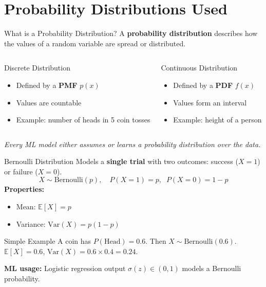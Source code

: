 \section{Probability Distributions Used}

\begin{frame}{What is a Probability Distribution?}
A \textbf{probability distribution} describes how the values of a random variable are spread or distributed.

\begin{columns}[T]
\begin{block}{Discrete Distribution}
\begin{itemize}
    \item Defined by a \textbf{PMF} $p(x)$
    \item Values are countable
    \item Example: number of heads in 5 coin tosses
\end{itemize}
\end{block}
\begin{block}{Continuous Distribution}
\begin{itemize}
    \item Defined by a \textbf{PDF} $f(x)$
    \item Values form an interval
    \item Example: height of a person
\end{itemize}
\end{block}
\end{columns}
\vspace{6pt}
\centering
\textit{Every ML model either assumes or learns a probability distribution over the data.}
\end{frame}

\begin{frame}{Bernoulli Distribution}
Models a \textbf{single trial} with two outcomes: success ($X=1$) or failure ($X=0$).
\[
X \sim \mathrm{Bernoulli}(p), \quad P(X=1) = p, \;\; P(X=0) = 1-p
\]
\textbf{Properties:}
\begin{itemize}
    \item Mean: $\mathbb{E}[X] = p$
    \item Variance: $\mathrm{Var}(X) = p(1-p)$
\end{itemize}
\begin{exampleblock}{Simple Example}
A coin has $P(\text{Head}) = 0.6$. Then $X \sim \mathrm{Bernoulli}(0.6)$.\\
$\mathbb{E}[X] = 0.6$, \quad $\mathrm{Var}(X) = 0.6 \times 0.4 = 0.24$.
\end{exampleblock}
\textbf{ML usage:} Logistic regression output $\sigma(z) \in (0,1)$ models a Bernoulli probability.
\end{frame}

